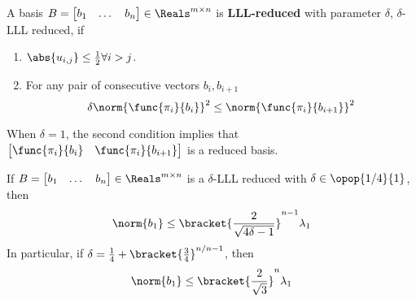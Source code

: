 \begin{definition}
    A basis \(B = \begin{bmatrix*} b_1 & \dots & b_n \end{bmatrix*} \in \Reals^{m \times n}\) is \textbf{LLL-reduced} with parameter \(\delta\), \(\delta\)-LLL reduced, if 
    \begin{enumerate}
        \item \(\abs{u_{i,j}} \leq \frac{1}{2} \forall i > j\).
        \item For any pair of consecutive vectors \(b_i, b_{i + 1}\)
        \begin{equation*}
            \delta \norm{\func{\pi_i}{b_i}}^2 \leq \norm{\func{\pi_i}{b_{i + 1}}}^2
        \end{equation*}
    \end{enumerate}
    When \(\delta = 1\), the second condition implies that \(\begin{bmatrix*}
        \func{\pi_i}{b_i} & \func{\pi_i}{b_{i + 1}}
    \end{bmatrix*}\) is a reduced basis.
 \end{definition}

 \begin{lemma}
    If \(B = \begin{bmatrix*} b_1 & \dots & b_n \end{bmatrix*} \in \Reals^{m \times n}\) is a \(\delta\)-LLL reduced with \(\delta \in \opop{1/4}{1}\), then 
    \begin{equation*}
        \norm{b_1} \leq \bracket{\dfrac{2}{\sqrt{4\delta - 1}}}^{n - 1} \lambda_1
    \end{equation*}
    In particular, if \(\delta = \frac{1}{4} + \bracket{\frac{3}{4}}^{n/n-1}\), then 
    \begin{equation*}
        \norm{b_1} \leq \bracket{\dfrac{2}{\sqrt{3}}}^n \lambda_1
    \end{equation*}
 \end{lemma}

